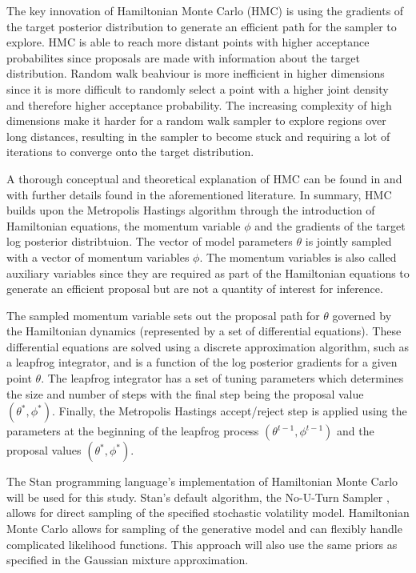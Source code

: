 \documentclass[12pt, a4paper]{article}
\begin{document}
        The key innovation of Hamiltonian Monte Carlo (HMC) is using the gradients of the target posterior distribution to generate an efficient path for the sampler to explore. HMC is able to reach more distant points with higher acceptance probabilites since proposals are made with information about the target distribution. Random walk beahviour is more inefficient in higher dimensions since it is more difficult to randomly select a point with a higher joint density and therefore higher acceptance probability. The increasing complexity of high dimensions make it harder for a random walk sampler to explore regions over long distances, resulting in the sampler to become stuck and requiring a lot of iterations to converge onto the target distribution. 

        A thorough conceptual and theoretical explanation of HMC can be found in \citet{gelman2013bayesian} and \citet{betancourt2017conceptual} with further details found in the aforementioned literature. In summary, HMC builds upon the Metropolis Hastings algorithm through the introduction of Hamiltonian equations, the momentum variable $\phi$ and the gradients of the target log posterior distribtuion. The vector of model parameters $\theta$ is jointly sampled with a vector of momentum variables $\phi$. The momentum variables is also called auxiliary variables since they are required as part of the Hamiltonian equations to generate an efficient proposal but are not a quantity of interest for inference.

        The sampled momentum variable sets out the proposal path for $\theta$ governed by the Hamiltonian dynamics (represented by a set of differential equations). These differential equations are solved using a discrete approximation algorithm, such as a leapfrog integrator, and is a function of the log posterior gradients for a given point $\theta$. The leapfrog integrator has a set of tuning parameters which determines the size and number of steps with the final step being the proposal value $(\theta^{\ast}, \phi^{\ast})$. Finally, the Metropolis Hastings accept/reject step is applied using the parameters at the beginning of the leapfrog process $(\theta^{t-1}, \phi^{t-1})$ and the proposal values $(\theta^{\ast}, \phi^{\ast})$. 

        The Stan programming language's implementation of Hamiltonian Monte Carlo will be used for this study. Stan's default algorithm, the No-U-Turn Sampler \citep{hoffman2014no}, allows for direct sampling of the specified stochastic volatility model. Hamiltonian Monte Carlo allows for sampling of the generative model and can flexibly handle complicated likelihood functions. This approach will also use the same priors as specified in the Gaussian mixture approximation.
\end{document}
